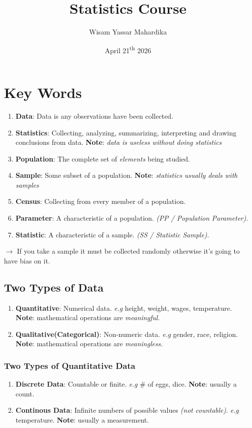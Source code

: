 \documentclass{article}
\title{Statistics Course}
\author{Wisam Yassar Mahardika}
\date{April 21\textsuperscript{th} 2026}
\begin{document}
\maketitle
\clearpage
\tableofcontents
\clearpage
\section{Key Words}
\begin{enumerate}
	\item \textbf{Data}: Data is any observations have been collected.
	\item \textbf{Statistics}: Collecting, analyzing, summarizing, interpreting and drawing conclusions from data. \textbf{Note}: \textit{data is useless without doing statistics}
	\item \textbf{Population}: The complete set of \textit{elements} being studied.
	\item \textbf{Sample}: Some subset of a population. \textbf{Note}: \textit{statistics usually deals with samples}
	\item \textbf{Census}: Collecting from every member of a population.
	\item \textbf{Parameter}: A characteristic of a population. \textit{(PP / Population Parameter).}
\item \textbf{Statistic}: A characteristic of a sample. \textit{(SS / Statistic Sample).}
\end{enumerate}
$ \rightarrow $ If you take a sample it must be collected randomly otherwise it's going to have bias on it.
\subsection{Two Types of Data}
\begin{enumerate}
\item \textbf{Quantitative}: Numerical data. \textit{e.g} height, weight, wages, temperature. \textbf{Note}: mathematical operations are \textit{meaningful.}
	\item \textbf{Qualitative(Categorical)}: Non-numeric data. \textit{e.g} gender, race, religion. \textbf{Note}: mathematical operations are \textit{meaningless.}
\end{enumerate}
\subsubsection{Two Types of Quantitative Data}
\begin{enumerate}
	\item \textbf{Discrete Data}: Countable or finite. \textit{e.g} \# of eggs, dice. \textbf{Note}: usually a count.
	\item \textbf{Continous Data}: Infinite numbers of possible values \textit{(not countable)}. \textit{e.g} temperature. \textbf{Note}: usually a measurement.
\end{enumerate}
\end{document}
